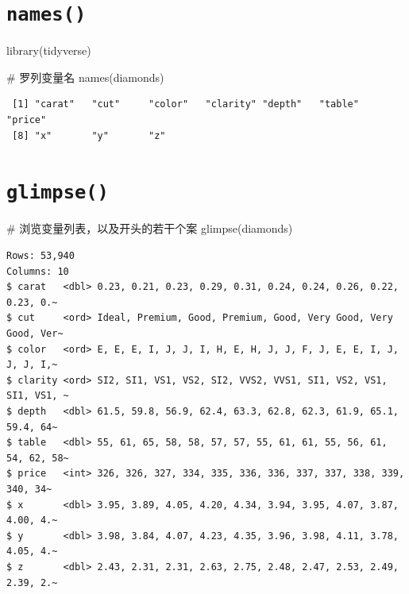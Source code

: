 \documentclass[
  letterpaper,
]{ctexbook}
\newenvironment{Shaded}{\begin{snugshade}}{\end{snugshade}}
\newcommand{\CommentTok}[1]{\textcolor[rgb]{0.37,0.37,0.37}{#1}}
\newcommand{\FunctionTok}[1]{\textcolor[rgb]{0.28,0.35,0.67}{#1}}
\newcommand{\NormalTok}[1]{\textcolor[rgb]{0.00,0.23,0.31}{#1}}
\begin{document}
\hypertarget{names}{%
\section{\texorpdfstring{\texttt{names()}}{names()}}\label{names}}

\begin{Shaded}
\begin{Highlighting}[]
\FunctionTok{library}\NormalTok{(tidyverse)}

\CommentTok{\# 罗列变量名}
\FunctionTok{names}\NormalTok{(diamonds)}
\end{Highlighting}
\end{Shaded}

\begin{verbatim}
 [1] "carat"   "cut"     "color"   "clarity" "depth"   "table"   "price"  
 [8] "x"       "y"       "z"      
\end{verbatim}

\hypertarget{glimpse}{%
\section{\texorpdfstring{\texttt{glimpse()}}{glimpse()}}\label{glimpse}}

\begin{Shaded}
\begin{Highlighting}[]
\CommentTok{\# 浏览变量列表，以及开头的若干个案}
\FunctionTok{glimpse}\NormalTok{(diamonds)}
\end{Highlighting}
\end{Shaded}

\begin{verbatim}
Rows: 53,940
Columns: 10
$ carat   <dbl> 0.23, 0.21, 0.23, 0.29, 0.31, 0.24, 0.24, 0.26, 0.22, 0.23, 0.~
$ cut     <ord> Ideal, Premium, Good, Premium, Good, Very Good, Very Good, Ver~
$ color   <ord> E, E, E, I, J, J, I, H, E, H, J, J, F, J, E, E, I, J, J, J, I,~
$ clarity <ord> SI2, SI1, VS1, VS2, SI2, VVS2, VVS1, SI1, VS2, VS1, SI1, VS1, ~
$ depth   <dbl> 61.5, 59.8, 56.9, 62.4, 63.3, 62.8, 62.3, 61.9, 65.1, 59.4, 64~
$ table   <dbl> 55, 61, 65, 58, 58, 57, 57, 55, 61, 61, 55, 56, 61, 54, 62, 58~
$ price   <int> 326, 326, 327, 334, 335, 336, 336, 337, 337, 338, 339, 340, 34~
$ x       <dbl> 3.95, 3.89, 4.05, 4.20, 4.34, 3.94, 3.95, 4.07, 3.87, 4.00, 4.~
$ y       <dbl> 3.98, 3.84, 4.07, 4.23, 4.35, 3.96, 3.98, 4.11, 3.78, 4.05, 4.~
$ z       <dbl> 2.43, 2.31, 2.31, 2.63, 2.75, 2.48, 2.47, 2.53, 2.49, 2.39, 2.~
\end{verbatim}
\end{document}
